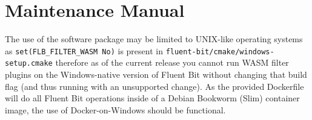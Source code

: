 \chapter{Maintenance Manual\label{chap:maintenance_man}}



The use of the software package may be limited to UNIX-like operating systems as \newline\texttt{set(FLB_FILTER_WASM           No)} is present in \texttt{fluent-bit/cmake/windows-setup.cmake} therefore as of the current release you cannot run WASM filter plugins on the Windows-native version of Fluent Bit without changing that build flag (and thus running with an unsupported change). As the provided Dockerfile will do all Fluent Bit operations inside of a Debian Bookworm (Slim) container image, the use of Docker-on-Windows should be functional.

